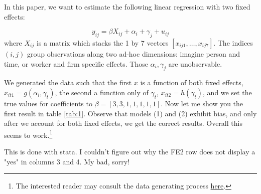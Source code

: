 \documentclass[12pt]{article}
\newcommand{\rootdir}{..}  %
\newcommand{\tables}{\rootdir/output/tables}
\begin{document}
In this paper, we want to estimate the following linear regression with two fixed effects:

\begin{equation}
y_{ij} = \beta X_{ij} + \alpha_i + \gamma_j + u_{ij} \label{eq:1}
\end{equation}
where $X_{ij}$ is a matrix which stacks the 1 by 7 vectors $[ x_{ij1}, \dots, x_{ij7}]$. The indices $(i,j)$ group observations along two ad-hoc dimensions: imagine person and time, or worker and firm specific effects. Those $\alpha_i,\gamma_j$ are unobservable.

We generated the data such that the first $x$ is a function of both fixed effects, $x_{it1} = g(\alpha_i, \gamma_t)$, the second a function only of $\gamma_t$, $x_{it2} = h(\gamma_t)$, and we set the true values for coefficients to $\beta = [ 3,3,1,1,1,1,1]$. Now let me show you the first result in table \ref{tab:1}. Observe that models (1) and (2) exhibit bias, and only after we account for both fixed effects, we get the correct results. Overall this seems to work.\footnote{The interested reader may consult the data generating process \href{https://github.com/floswald/ReproData.jl/blob/main/src/ReproData.jl}{here}.}

\begin{table}
\centering

\caption{This is done with stata. I couldn't figure out why the FE2 row does not display a "yes" in columns 3 and 4. My bad, sorry!\label{tab:1}}
\end{table}
\end{document}
